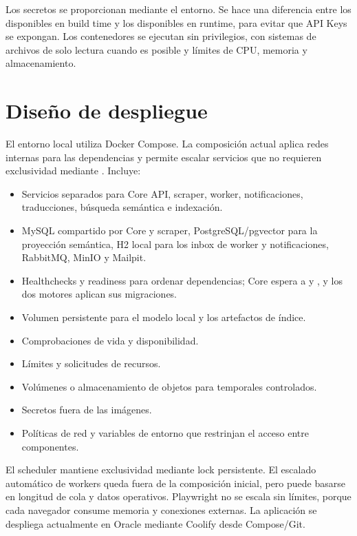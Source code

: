 Los secretos se proporcionan mediante el entorno. Se hace una diferencia entre los disponibles en build time y los disponibles en runtime, para evitar que API Keys se expongan. Los contenedores se ejecutan sin privilegios, con sistemas de archivos de solo lectura cuando es posible y límites de CPU, memoria y almacenamiento.

\section{Diseño de despliegue}

El entorno local utiliza Docker Compose. La composición actual aplica redes internas para las dependencias y permite escalar servicios que no requieren exclusividad mediante . Incluye:

\begin{itemize}
	\item Servicios separados para Core API, scraper, worker, notificaciones, traducciones, búsqueda semántica e indexación.
	\item MySQL compartido por Core y scraper, PostgreSQL/pgvector para la proyección semántica, H2 local para los inbox de worker y notificaciones, RabbitMQ, MinIO y Mailpit.
	\item Healthchecks y readiness para ordenar dependencias; Core espera a  y , y los dos motores aplican sus migraciones.
	\item Volumen persistente para el modelo local y los artefactos de índice.
	\item Comprobaciones de vida y disponibilidad.
	\item Límites y solicitudes de recursos.
	\item Volúmenes o almacenamiento de objetos para temporales controlados.
	\item Secretos fuera de las imágenes.
	\item Políticas de red y variables de entorno que restrinjan el acceso entre componentes.
\end{itemize}

El scheduler mantiene exclusividad mediante lock persistente. El escalado automático de workers queda fuera de la composición inicial, pero puede basarse en longitud de cola y datos operativos. Playwright no se escala sin límites, porque cada navegador consume memoria y conexiones externas. La aplicación se despliega actualmente en Oracle mediante Coolify desde Compose/Git.
